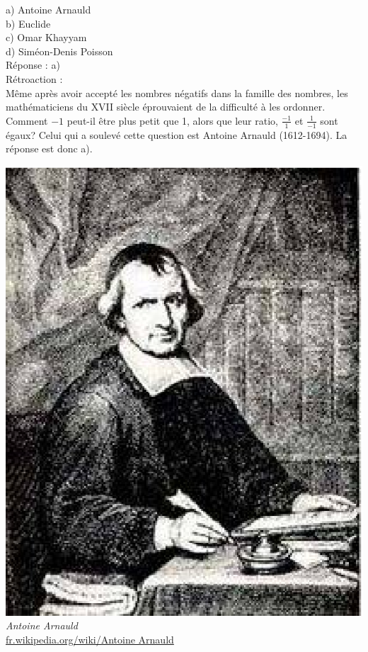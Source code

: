 \documentclass[letterpaper, 12pt]{article}
\begin{document}
a) Antoine Arnauld\\
b) Euclide\\
c) Omar Khayyam\\
d) Sim\'eon-Denis Poisson\\

R\'eponse : a)\\

R\'etroaction :\\
M\^eme apr\`es avoir accept\'e les nombres n\'egatifs dans la famille des nombres, les math\'ematiciens du {\scriptsize XVII\ieme{}} si\`ecle \'eprouvaient de la difficult\'e \`a les ordonner. Comment $-1$ peut-il \^etre plus petit que 1, alors que leur ratio, $\frac{-1}{1}$ et $\frac{1}{-1}$ sont \'egaux? Celui qui a soulev\'e cette question est Antoine Arnauld {\small (1612-1694)}. La r\'eponse est donc a).

\begin{center}
\includegraphics[scale=0.5]{Antoine_Arnauld.eps}\\
\emph{{\small Antoine Arnauld}}\\
\href{http://fr.wikipedia.org/wiki/Antoine Arnauld}{fr.wikipedia.org/wiki/Antoine Arnauld}\\[5mm]
\end{center}
\end{document}
